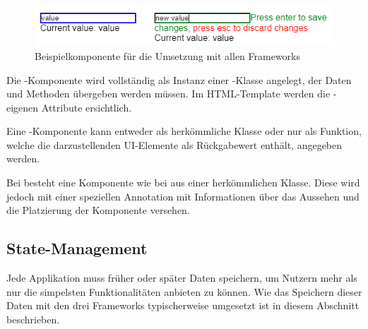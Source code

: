 \begin{figure}
    \centering
    \captionsetup{justification=centering}
    \includegraphics{figures/example_component.png}
        \caption{Beispielkomponente für die Umsetzung mit allen Frameworks}\label{fig:example_component}
\end{figure}

Die -Komponente wird vollständig als Instanz einer -Klasse angelegt, der Daten und Methoden übergeben werden müssen. Im HTML-Template werden die -eigenen Attribute ersichtlich.



Eine -Komponente kann entweder als herkömmliche Klasse oder nur als Funktion, welche die darzustellenden UI-Elemente als Rückgabewert enthält, angegeben werden.





Bei  besteht eine Komponente wie bei  aus einer herkömmlichen Klasse. Diese wird jedoch mit einer speziellen Annotation mit Informationen über das Aussehen und die Platzierung der Komponente versehen.



\subsection{State-Management}
Jede Applikation muss früher oder später Daten speichern, um Nutzern mehr als nur die simpelsten Funktionalitäten anbieten zu können. Wie das Speichern dieser Daten mit den drei Frameworks typischerweise umgesetzt ist in diesem Abschnitt beschrieben.

